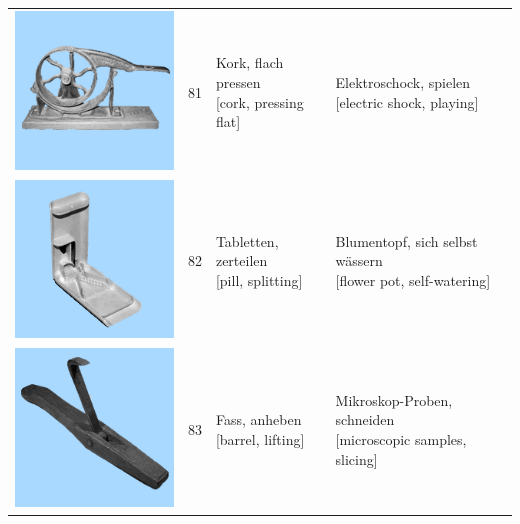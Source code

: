 \documentclass[
  english,
  doc,12pt,twoside,floatsintext]{apa7}
\begin{document}
\begin{center}
\begin{ThreePartTable}
{\begin{longtable}{llll}
\includegraphics[valign=c, scale=0.23]{../materials/unfamiliar/81.png} & 81 & \makecell[l]{Kork, flach pressen\\{[cork, pressing flat]}} & \makecell[l]{Elektroschock, spielen\\{[electric shock, playing]}}\\
\includegraphics[valign=c, scale=0.23]{../materials/unfamiliar/82.png} & 82 & \makecell[l]{Tabletten, zerteilen\\{[pill, splitting]}} & \makecell[l]{Blumentopf, sich selbst wässern\\{[flower pot, self-watering]}}\\
\includegraphics[valign=c, scale=0.23]{../materials/unfamiliar/83.png} & 83 & \makecell[l]{Fass, anheben\\{[barrel, lifting]}} & \makecell[l]{Mikroskop-Proben, schneiden\\{[microscopic samples, slicing]}}\\

\end{longtable}}
\end{ThreePartTable}
\end{center}
\end{document}
